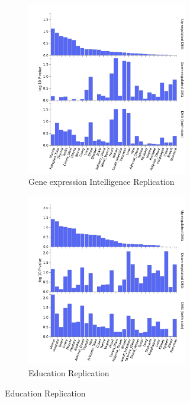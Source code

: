  \begin{figure}
  \begin{subfigure}{8cm}
    \centering\includegraphics[width=7cm]{images/FUMA_plots/deg_general_up/ctg_upreg_general_gtex_v8_ts_general_FUMA_gene2func44709.png}
    \caption{Gene expression Intelligence Replication}
    \end{subfigure}
  \begin{subfigure}{8cm}
    \centering\includegraphics[width=7cm]{images/FUMA_plots/deg_general_up/ea2_corrected_upreg_general_gtex_v8_ts_general_FUMA_gene2func44667.png}
    \caption{Education Replication}
  \end{subfigure}
 

\end{figure}
